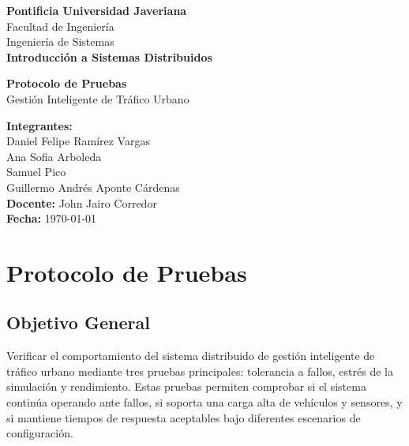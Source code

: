 \documentclass[12pt, a4paper]{article}
\begin{document}
\begin{titlepage}
    \centering

    \vspace*{1cm}

    {\Large \textbf{Pontificia Universidad Javeriana}}\\[0.3cm]
    Facultad de Ingeniería\\
    Ingeniería de Sistemas\\[1.2cm]

    {\Large \textbf{Introducción a Sistemas Distribuidos}}\\[1cm]

    \vfill

    {\Huge \textbf{Protocolo de Pruebas}}\\[0.4cm]
    {\LARGE Gestión Inteligente de Tráfico Urbano}\\[1cm]

    \vfill

    \textbf{Integrantes:}\\
    Daniel Felipe Ramírez Vargas\\
    Ana Sofia Arboleda\\
    Samuel Pico\\
    Guillermo Andrés Aponte Cárdenas\\[1cm]

    \textbf{Docente:} John Jairo Corredor\\[1cm]

    \textbf{Fecha:} \today

    \vfill
\end{titlepage}

\tableofcontents
\clearpage

\section{Protocolo de Pruebas}

\subsection{Objetivo General}

Verificar el comportamiento del sistema distribuido de gestión inteligente de tráfico urbano mediante tres pruebas principales: tolerancia a fallos, estrés de la simulación y rendimiento. Estas pruebas permiten comprobar si el sistema continúa operando ante fallos, si soporta una carga alta de vehículos y sensores, y si mantiene tiempos de respuesta aceptables bajo diferentes escenarios de configuración.
\end{document}
